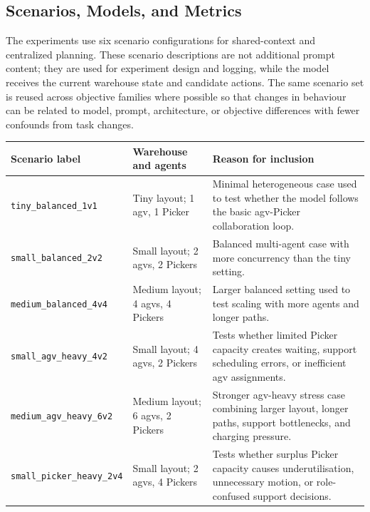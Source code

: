 \subsection{Scenarios, Models, and Metrics}
\label{sec:method_scenarios_models_metrics}
The experiments use six scenario configurations for shared-context and centralized planning.
These scenario descriptions are not additional prompt content; they are used for experiment design and logging, while the model receives the current warehouse state and candidate actions.
The same scenario set is reused across objective families where possible so that changes in behaviour can be related to model, prompt, architecture, or objective differences with fewer confounds from task changes.

\begin{center}
\begingroup
\small
\setlength{\tabcolsep}{4pt}
\captionsetup{type=table,hypcap=false}
\begin{tabular}{|p{}|p{}|p{}|}
\hline
\textbf{Scenario label} & \textbf{Warehouse and agents} & \textbf{Reason for inclusion} \\
\hline
\nolinkurl{tiny_balanced_1v1} & Tiny layout; 1 \gls{agv}, 1 Picker & Minimal heterogeneous case used to test whether the model follows the basic \gls{agv}-Picker collaboration loop. \\
\hline
\nolinkurl{small_balanced_2v2} & Small layout; 2 \glspl{agv}, 2 Pickers & Balanced multi-agent case with more concurrency than the tiny setting. \\
\hline
\nolinkurl{medium_balanced_4v4} & Medium layout; 4 \glspl{agv}, 4 Pickers & Larger balanced setting used to test scaling with more agents and longer paths. \\
\hline
\nolinkurl{small_agv_heavy_4v2} & Small layout; 4 \glspl{agv}, 2 Pickers & Tests whether limited Picker capacity creates waiting, support scheduling errors, or inefficient \gls{agv} assignments. \\
\hline
\nolinkurl{medium_agv_heavy_6v2} & Medium layout; 6 \glspl{agv}, 2 Pickers & Stronger \gls{agv}-heavy stress case combining larger layout, longer paths, support bottlenecks, and charging pressure. \\
\hline
\nolinkurl{small_picker_heavy_2v4} & Small layout; 2 \glspl{agv}, 4 Pickers & Tests whether surplus Picker capacity causes underutilisation, unnecessary motion, or role-confused support decisions. \\
\hline
\end{tabular}
\caption{Warehouse scenarios used in the objective experiments.}
\label{tab:warehouse-scenarios}
\endgroup
\end{center}

